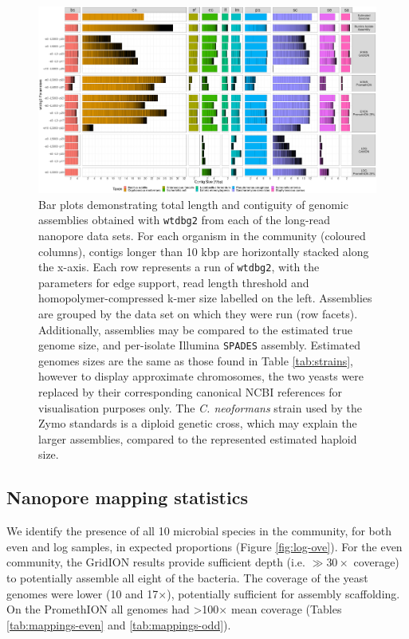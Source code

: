 \documentclass[a4paper,num-refs]{oup-contemporary}
\begin{document}
\begin{figure}[t!]
\centering
\includegraphics[width=\linewidth]{figures/w2.png}
\caption{Bar plots demonstrating total length and contiguity of genomic assemblies obtained with \texttt{wtdbg2} from each of the long-read nanopore data sets. For each organism in the community (coloured columns), contigs longer than 10 kbp are horizontally stacked along the x-axis. Each row represents a run of \texttt{wtdbg2}, with the parameters for edge support, read length threshold and homopolymer-compressed k-mer size labelled on the left. Assemblies are grouped by the data set on which they were run (row facets). Additionally, assemblies may be compared to the estimated true genome size, and per-isolate Illumina \texttt{SPADES} assembly. Estimated genomes sizes are the same as those found in Table \ref{tab:strains}, however to display approximate chromosomes, the two yeasts were replaced by their corresponding canonical NCBI references for visualisation purposes only. The \textit{C. neoformans} strain used by the Zymo standards is a diploid genetic cross, which may explain the larger assemblies, compared to the represented estimated haploid size.
}\label{fig:assemblies}
\end{figure}


\subsection{Nanopore mapping statistics}

We identify the presence of all 10 microbial species in the community, for both even and log samples, in expected proportions (Figure \ref{fig:log-ove}). For the even community, the GridION results provide sufficient depth (i.e. $\gg30\times$ coverage) to potentially assemble all eight of the bacteria. The coverage of the yeast genomes were lower (10 and 17$\times$), potentially sufficient for assembly scaffolding.
On the PromethION all genomes had >100$\times$ mean coverage (Tables \ref{tab:mappings-even} and \ref{tab:mappings-odd}).
\end{document}
